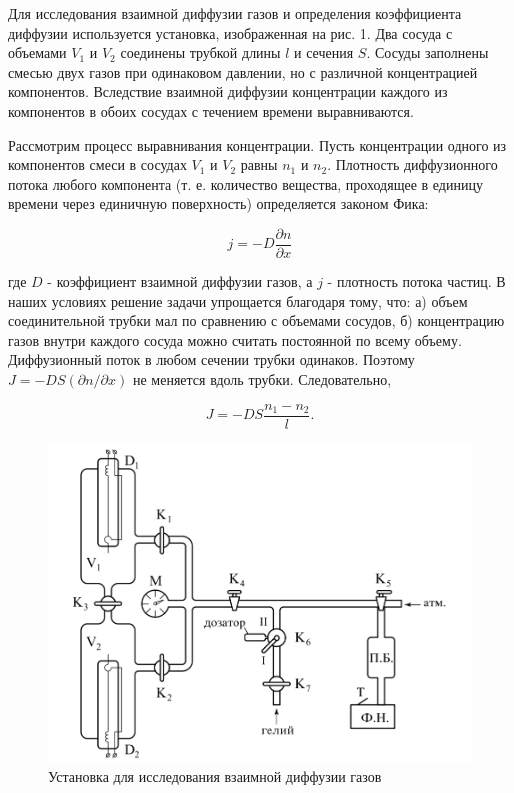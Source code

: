 \documentclass[a4paper,12pt]{article} %
\begin{document}
	
Для исследования взаимной диффузии газов и определения коэффициента диффузии используется установка, изображенная на рис. 1. Два сосуда с объемами $V_{1}$ и $V_{2}$ соединены трубкой длины $l$ и сечения $S$. Сосуды заполнены смесью двух газов при одинаковом давлении, но с различной концентрацией компонентов. Вследствие взаимной диффузии концентрации каждого из компонентов в обоих сосудах с течением времени выравниваются.


Рассмотрим процесс выравнивания концентрации. Пусть концентрации одного из компонентов смеси в сосудах $V_{1}$ и $V_{2}$ равны $n_{1}$ и $n_{2}$. Плотность диффузионного потока любого компонента (т. е. количество вещества, проходящее в единицу времени через единичную поверхность) определяется законом Фика:


\begin{equation}
	j = -D \frac{\partial n}{\partial x}
\end{equation}

где $D$ - коэффициент взаимной диффузии газов, а $j$ - плотность потока частиц. В наших условиях решение задачи упрощается благодаря тому, что: а) объем соединительной трубки мал по сравнению с объемами сосудов, б) концентрацию газов внутри каждого сосуда можно считать постоянной по всему объему. Диффузионный поток в любом сечении трубки одинаков. Поэтому $J = -DS(\partial n/\partial x)$ не меняется вдоль трубки. Следовательно,


\begin{equation}
	J = - DS\frac{n_{1} - n_{2}}{l}.
\end{equation}

\newpage

\begin{figure}[h!]
	\centering
	\includegraphics[scale=0.8]{Рис1.png}
	\caption{Установка для исследования взаимной диффузии газов}
\end{figure}
\end{document}
